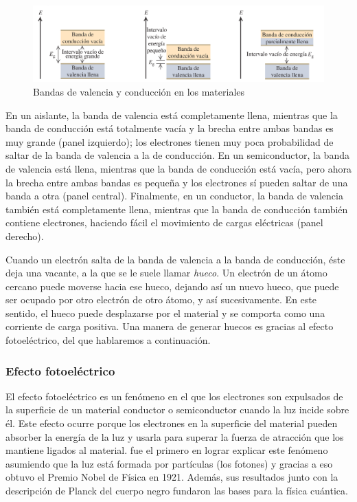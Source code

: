 \begin{figure}[htb]
  \centering
				\includegraphics[width=\textwidth]{figures/energy_bands.png}
				\caption{Bandas de valencia y conducción en los materiales}
				\label{fig:valence-bands} 
\end{figure}

En un aislante, la banda de valencia está completamente llena, mientras que la banda de conducción está totalmente vacía y la brecha entre ambas bandas es muy grande (panel izquierdo); los electrones tienen muy poca probabilidad de saltar de la banda de valencia a la de conducción. En un semiconductor, la banda de valencia está llena, mientras que la banda de conducción está vacía, pero ahora la brecha entre ambas bandas es pequeña y los electrones sí pueden saltar de una banda a otra (panel central). Finalmente, en un conductor, la banda de valencia también está completamente llena, mientras que la banda de conducción también contiene electrones, haciendo fácil el movimiento de cargas eléctricas (panel derecho). 

Cuando un electrón salta de la banda de valencia a la banda de conducción, éste deja una vacante, a la que se le suele llamar \emph{hueco}. Un electrón de un átomo cercano puede moverse hacia ese hueco, dejando así un nuevo hueco, que puede ser ocupado por otro electrón de otro átomo, y así sucesivamente. En este sentido, el hueco puede desplazarse por el material y se comporta como una corriente de carga positiva. Una manera de generar huecos es gracias al efecto fotoeléctrico, del que hablaremos a continuación. 

\subsubsection{Efecto fotoeléctrico}
El efecto fotoeléctrico es un fenómeno en el que los electrones son expulsados ​​de la superficie de un material conductor o semiconductor cuando la luz incide sobre él. Este efecto ocurre porque los electrones en la superficie del material pueden absorber la energía de la luz y usarla para superar la fuerza de atracción que los mantiene ligados al material. \citet{einstein1905heuristic} fue el primero en lograr explicar este fenómeno asumiendo que la luz está formada por partículas (los fotones) y gracias a eso obtuvo el Premio Nobel de Física en 1921. Además, sus resultados junto con la descripción de Planck del cuerpo negro fundaron las bases para la física cuántica. 

